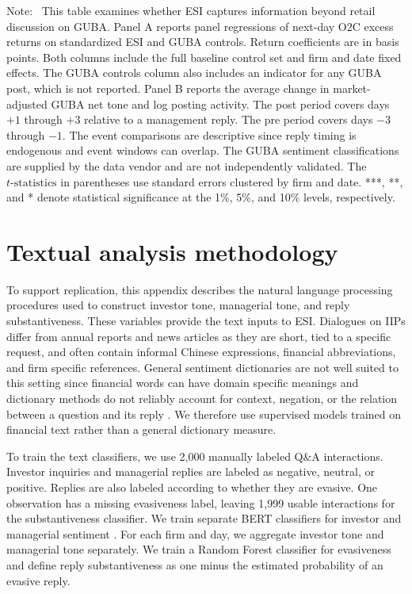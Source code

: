 \documentclass[12pt]{article}
\newenvironment{tablenoteblock}
{%
  \vspace{0.12cm}
  \begin{tablenotes}[flushleft]
  \footnotesize
  \setlength{\itemsep}{0pt}
  \setlength{\parsep}{0pt}
  \item[]\justifying
  \textnormal{Note:}\ 
}
{%
  \end{tablenotes}
}
\begin{document}
\begin{table}[H]
\begin{threeparttable}
\begin{tablenoteblock}
    This table examines whether ESI captures information beyond retail discussion on GUBA. Panel A reports panel regressions of next-day O2C excess returns on standardized ESI and GUBA controls. Return coefficients are in basis points. Both columns include the full baseline control set and firm and date fixed effects. The GUBA controls column also includes an indicator for any GUBA post, which is not reported. Panel B reports the average change in market-adjusted GUBA net tone and log posting activity. The post period covers days $+1$ through $+3$ relative to a management reply. The pre period covers days $-3$ through $-1$. The event comparisons are descriptive since reply timing is endogenous and event windows can overlap. The GUBA sentiment classifications are supplied by the data vendor and are not independently validated. The $t\text{-statistics}$ in parentheses use standard errors clustered by firm and date. ***, **, and * denote statistical significance at the 1\%, 5\%, and 10\% levels, respectively.
  \end{tablenoteblock}
  \end{threeparttable}
\end{table}
\clearpage




\clearpage

\clearpage

\clearpage

\section{Textual analysis methodology} \label{app:nlp_methodology}

To support replication, this appendix describes the natural language processing procedures used to construct investor tone, managerial tone, and reply substantiveness. These variables provide the text inputs to ESI. Dialogues on IIPs differ from annual reports and news articles as they are short, tied to a specific request, and often contain informal Chinese expressions, financial abbreviations, and firm specific references. General sentiment dictionaries are not well suited to this setting since financial words can have domain specific meanings and dictionary methods do not reliably account for context, negation, or the relation between a question and its reply \citep{loughran2011}. We therefore use supervised models trained on financial text rather than a general dictionary measure.

To train the text classifiers, we use 2,000 manually labeled Q\&A interactions. Investor inquiries and managerial replies are labeled as negative, neutral, or positive. Replies are also labeled according to whether they are evasive. One observation has a missing evasiveness label, leaving 1,999 usable interactions for the substantiveness classifier. We train separate BERT classifiers for investor and managerial sentiment \citep{liu2020finbert}. For each firm and day, we aggregate investor tone and managerial tone separately. We train a Random Forest classifier for evasiveness and define reply substantiveness as one minus the estimated probability of an evasive reply.
\end{document}
